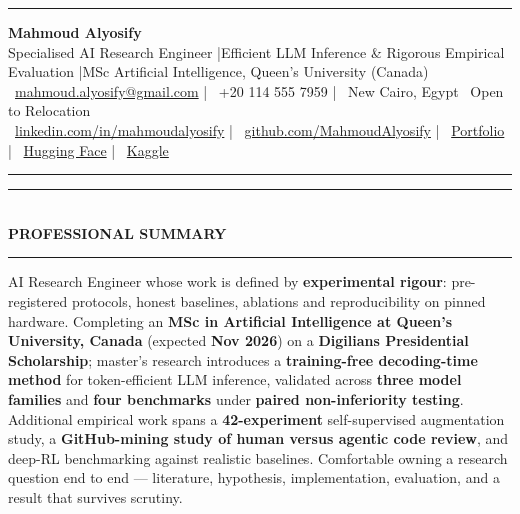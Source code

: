 \documentclass[10pt, a4paper]{article}
\newcommand{\faEnvelope}{}\newcommand{\faPhone}{}\newcommand{\faMapMarker}{}%
\newcommand{\faLinkedin}{}\newcommand{\faGithub}{}\newcommand{\faRobot}{}%
\newcommand{\faChartBar}{}\newcommand{\faGlobe}{}%
\newcommand{\cvsection}[1]{%
  \vspace{3pt}%
  {\color{navy}\rule{\linewidth}{1.1pt}}\\[0.5pt]%
  {\color{navy}\bfseries\fontsize{9.5}{11}\selectfont\uppercase{#1}}\\[-4pt]%
  {\color{teal}\rule{\linewidth}{0.6pt}}%
  \vspace{2pt}%
}
\begin{document}
\small

{\color{navy}\rule{\linewidth}{1.5pt}}

\vspace{3pt}
\begin{center}
  {\fontsize{21}{24}\bfseries\color{navy} Mahmoud Alyosify}\\[3pt]
  {\fontsize{10}{12}\color{teal}
    Specialised AI Research Engineer \enspace|\enspace Efficient LLM Inference \& Rigorous Empirical Evaluation
    \enspace|\enspace MSc Artificial Intelligence, Queen's University (Canada)
}\\[4pt]
  {\color{midgray}
    \faEnvelope\ \href{mailto:mahmoud.alyosify@gmail.com}{mahmoud.alyosify@gmail.com}
    \enspace|\enspace
    \faPhone\ +20 114 555 7959
    \enspace|\enspace
    \faMapMarker\ New Cairo, Egypt \textperiodcentered\ Open to Relocation}\\[2pt]
  {\faLinkedin\ \href{https://linkedin.com/in/mahmoudalyosify}{linkedin.com/in/mahmoudalyosify}
    \enspace|\enspace
    \faGithub\ \href{https://github.com/MahmoudAlyosify}{github.com/MahmoudAlyosify}
    \enspace|\enspace
    \faGlobe\ \href{https://mahmoudalyosifysite.github.io/}{Portfolio}
    \enspace|\enspace
    \faRobot\ \href{https://huggingface.co/mahmoudalyosify}{Hugging Face}
    \enspace|\enspace
    \faChartBar\ \href{https://kaggle.com/mahmoudalyosify}{Kaggle}}
\end{center}

{\color{navy}\rule{\linewidth}{1.5pt}}

\vspace{2pt}

\cvsection{Professional Summary}

{\color{darkgray}\justifying
AI Research Engineer whose work is defined by \textbf{experimental rigour}: pre-registered protocols, honest baselines, ablations and reproducibility on pinned hardware. Completing an \textbf{MSc in Artificial Intelligence at Queen's University, Canada} (expected \textbf{Nov 2026}) on a \textbf{Digilians Presidential Scholarship}; master's research introduces a \textbf{training-free decoding-time method} for token-efficient LLM inference, validated across \textbf{three model families} and \textbf{four benchmarks} under \textbf{paired non-inferiority testing}. Additional empirical work spans a \textbf{42-experiment} self-supervised augmentation study, a \textbf{GitHub-mining study of human versus agentic code review}, and deep-RL benchmarking against realistic baselines. Comfortable owning a research question end to end --- literature, hypothesis, implementation, evaluation, and a result that survives scrutiny.}
\end{document}
